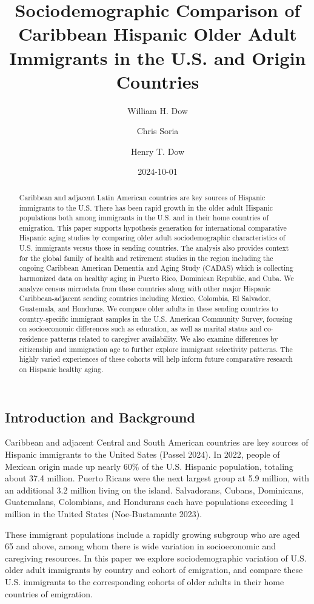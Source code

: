 \documentclass[
]{article}
\title{Sociodemographic Comparison of Caribbean Hispanic Older Adult
Immigrants in the U.S. and Origin Countries}
\author{William H. Dow \and Chris Soria \and Henry T. Dow}
\date{2024-10-01}
\begin{document}
\maketitle
\begin{abstract}
Caribbean and adjacent Latin American countries are key sources of
Hispanic immigrants to the U.S. There has been rapid growth in the older
adult Hispanic populations both among immigrants in the U.S. and in
their home countries of emigration. This paper supports hypothesis
generation for international comparative Hispanic aging studies by
comparing older adult sociodemographic characteristics of U.S.
immigrants versus those in sending countries. The analysis also provides
context for the global family of health and retirement studies in the
region including the ongoing Caribbean American Dementia and Aging Study
(CADAS) which is collecting harmonized data on healthy aging in Puerto
Rico, Dominican Republic, and Cuba. We analyze census microdata from
these countries along with other major Hispanic Caribbean-adjacent
sending countries including Mexico, Colombia, El Salvador, Guatemala,
and Honduras. We compare older adults in these sending countries to
country-specific immigrant samples in the U.S. American Community
Survey, focusing on socioeconomic differences such as education, as well
as marital status and co-residence patterns related to caregiver
availability. We also examine differences by citizenship and immigration
age to further explore immigrant selectivity patterns. The highly varied
experiences of these cohorts will help inform future comparative
research on Hispanic healthy aging.
\end{abstract}


\subsection{Introduction and Background}\label{sec-intro}

Caribbean and adjacent Central and South American countries are key
sources of Hispanic immigrants to the United Sates (Passel 2024). In
2022, people of Mexican origin made up nearly 60\% of the U.S. Hispanic
population, totaling about 37.4 million. Puerto Ricans were the next
largest group at 5.9 million, with an additional 3.2 million living on
the island. Salvadorans, Cubans, Dominicans, Guatemalans, Colombians,
and Hondurans each have populations exceeding 1 million in the United
States (Noe-Bustamante 2023).

These immigrant populations include a rapidly growing subgroup who are
aged 65 and above, among whom there is wide variation in socioeconomic
and caregiving resources. In this paper we explore sociodemographic
variation of U.S. older adult immigrants by country and cohort of
emigration, and compare these U.S. immigrants to the corresponding
cohorts of older adults in their home countries of emigration.
\end{document}
